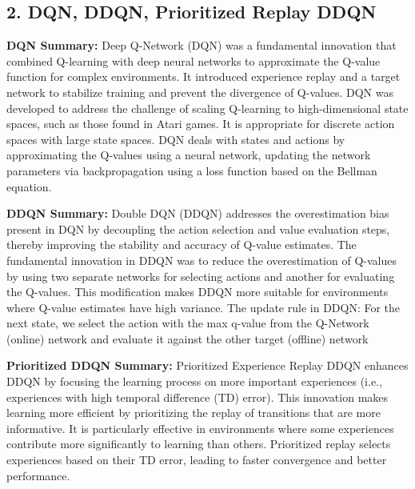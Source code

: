 \documentclass[a4paper,10pt]{article}
\begin{document}
\begin{multicols}{2}
\section*{2. DQN, DDQN, Prioritized Replay DDQN}
\textbf{DQN Summary:} Deep Q-Network (DQN) was a fundamental innovation that combined Q-learning with deep neural networks to approximate the Q-value function for complex environments. It introduced experience replay and a target network to stabilize training and prevent the divergence of Q-values. DQN was developed to address the challenge of scaling Q-learning to high-dimensional state spaces, such as those found in Atari games. It is appropriate for discrete action spaces with large state spaces. DQN deals with states and actions by approximating the Q-values using a neural network, updating the network parameters via backpropagation using a loss function based on the Bellman equation.

\textbf{DDQN Summary:} Double DQN (DDQN) addresses the overestimation bias present in DQN by decoupling the action selection and value evaluation steps, thereby improving the stability and accuracy of Q-value estimates. The fundamental innovation in DDQN was to reduce the overestimation of Q-values by using two separate networks for selecting actions and another for evaluating the Q-values. This modification makes DDQN more suitable for environments where Q-value estimates have high variance. The update rule in DDQN: For the next state, we select the action with the max q-value from the Q-Network (online) network and evaluate it against the other target (offline) network

\textbf{Prioritized DDQN Summary:} Prioritized Experience Replay DDQN enhances DDQN by focusing the learning process on more important experiences (i.e., experiences with high temporal difference (TD) error). This innovation makes learning more efficient by prioritizing the replay of transitions that are more informative. It is particularly effective in environments where some experiences contribute more significantly to learning than others. Prioritized replay selects experiences based on their TD error, leading to faster convergence and better performance.


\end{multicols}
\end{document}
